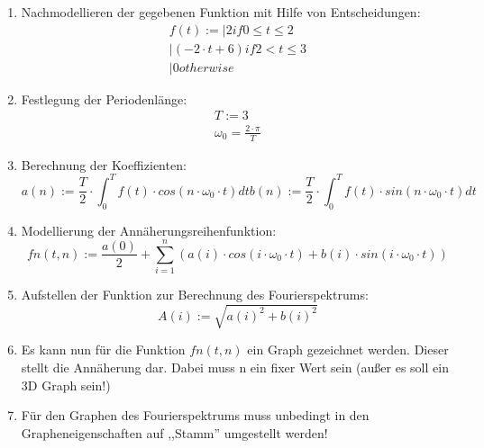 \documentclass[a4paper,10pt]{article}
\begin{document}
\begin{enumerate}
\item { Nachmodellieren der gegebenen Funktion mit Hilfe von
    Entscheidungen:
    \begin{equation}
      \label{eq:5}
      \begin{split}
        f(t) := \rvert{2 if 0 \le t \le 2}\\
        \rvert{(-2 \cdot t + 6) if 2 < t \le 3}\\
        \rvert{0 otherwise}
      \end{split}
    \end{equation}
  }
\item { Festlegung der Periodenlänge:
    \begin{equation}
      \label{eq:6}
      \begin{split}
        T := 3\\
        \omega_0 = \frac{2 \cdot \pi}{T}
      \end{split}
    \end{equation}
  }
\item { Berechnung der Koeffizienten:
    \begin{equation}
      \label{eq:7}
          a(n) := \frac{T}{2} \cdot \int_{0}^{T} f(t) \cdot cos(n \cdot \omega_0 \cdot t) dt
          b(n) := \frac{T}{2} \cdot \int_{0}^{T} f(t) \cdot sin(n \cdot \omega_0 \cdot t) dt
    \end{equation}
  }
\item { Modellierung der Annäherungsreihenfunktion:
    \begin{equation}
      \label{eq:8}
      fn(t,n) := \frac{a(0)}{2} + \sum_{i = 1}^{n} (a(i) \cdot cos(i \cdot \omega_0 \cdot t) + b(i) \cdot sin(i \cdot \omega_0 \cdot t))
    \end{equation}
  }
\item { Aufstellen der Funktion zur Berechnung des Fourierspektrums:
    \begin{equation}
      \label{eq:9}
      A(i) := \sqrt{a(i)^2 + b(i)^2}
    \end{equation}
  }
\item { Es kann nun für die Funktion $ fn(t, n) $ ein Graph gezeichnet
    werden. Dieser stellt die Annäherung dar. Dabei muss n ein fixer
    Wert sein (außer es soll ein 3D Graph sein!)
  }
\item { Für den Graphen des Fourierspektrums muss unbedingt in den
    Grapheneigenschaften auf ,,Stamm'' umgestellt werden!
  }
\end{enumerate}
\end{document}
